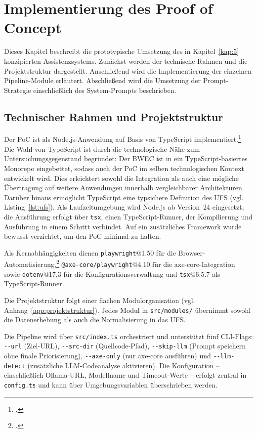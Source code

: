 \chapter{Implementierung des Proof of Concept} \label{kap:6}

Dieses Kapitel beschreibt die prototypische Umsetzung des in Kapitel~\ref{kap:5} konzipierten Assistenzsystems. Zunächst werden der technische Rahmen und die Projektstruktur dargestellt. Anschließend wird die Implementierung der einzelnen Pipeline-Module erläutert. Abschließend wird die Umsetzung der Prompt-Strategie einschließlich des System-Prompts beschrieben.

\section{Technischer Rahmen und Projektstruktur}
\label{sec:techstack}

Der \ac{PoC} ist als Node.js-Anwendung auf Basis von TypeScript implementiert.\footcite[Vgl.][]{JavaScriptSyntaxTypesa} Die Wahl von TypeScript ist durch die technologische Nähe zum Untersuchungsgegenstand begründet: Der \ac{BWEC} ist in ein TypeScript-basiertes Monorepo eingebettet, sodass auch der \ac{PoC} im selben technologischen Kontext entwickelt wird. Dies erleichtert sowohl die Integration als auch eine mögliche Übertragung auf weitere Anwendungen innerhalb vergleichbarer Architekturen. \mbox{Darüber} hinaus ermöglicht TypeScript eine typsichere Definition des \ac{UFS} (vgl. Listing~\ref{lst:ufs}). Als Laufzeitumgebung wird Node.js ab Version~24 eingesetzt; die Ausführung erfolgt über \texttt{tsx}, einen TypeScript-Runner, der Kompilierung und Ausführung in einem Schritt verbindet. Auf ein zusätzliches Framework wurde bewusst verzichtet, um den \ac{PoC} minimal zu halten.

Als Kernabhängigkeiten dienen \texttt{playwright}@1.50 für die Browser-Automatisierung,\footcite[Vgl.][]{playwright} \texttt{@axe-core/playwright}@4.10 für die axe-core-Integration sowie \texttt{dotenv}@17.3 für die Konfigurationsverwaltung und \texttt{tsx}@6.5.7 als TypeScript-Runner.

Die Projektstruktur folgt einer flachen Modulorganisation (vgl.\,Anhang~\ref{app:projektstruktur}). Jedes Modul in \texttt{src/modules/} übernimmt sowohl die Datenerhebung als auch die Normalisierung in das \ac{UFS}.

Die Pipeline wird über \texttt{src/index.ts} orchestriert und unterstützt fünf \ac{CLI}-Flags: \texttt{-{}-url} (Ziel-\acs{URL}), \texttt{-{}-src-dir} (Quellcode-Pfad), \texttt{-{}-skip-llm} (Prompt speichern ohne finale Priorisierung), \texttt{-{}-axe-only} (nur axe-core ausführen) und \texttt{-{}-llm-detect} (zusätzliche \ac{LLM}-Codeanalyse aktivieren). Die Konfiguration -- einschließlich Ollama-\acs{URL}, Modellname und Timeout-Werte -- erfolgt zentral in \texttt{config.ts} und kann über Umgebungsvariablen überschrieben werden.

